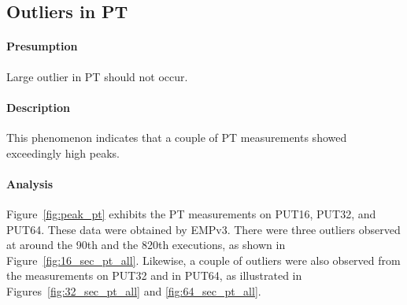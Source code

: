 \documentclass[10pt]{article}
\begin{document}
\newpage

\subsection{Outliers in PT}

\paragraph{Presumption} Large outlier in PT should not occur. 

\paragraph{Description} 
This phenomenon indicates that a couple of PT measurements showed exceedingly high peaks. 

\paragraph{Analysis} 

Figure~\ref{fig:peak_pt} exhibits the PT measurements on PUT16, PUT32, and PUT64. 
These data were obtained by EMPv3. 
There were three outliers observed at around the 90th and the 820th executions, as shown in Figure~\ref{fig:16_sec_pt_all}.
Likewise, a couple of outliers were also observed from the measurements on PUT32 and in PUT64, 
as illustrated in Figures~\ref{fig:32_sec_pt_all} and \ref{fig:64_sec_pt_all}.
\end{document}
